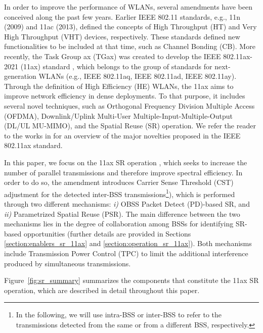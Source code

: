 \documentclass{ieeeaccess}
\begin{document}
In order to improve the performance of WLANs, several amendments have been conceived along the past few years. Earlier IEEE 802.11 standards, e.g., 11n (2009) and 11ac (2013), defined the concepts of High Throughput (HT) and Very High Throughput (VHT) devices, respectively. These standards defined new functionalities to be included at that time, such as Channel Bonding (CB). More recently, the Task Group ax (TGax) was created to develop the IEEE 802.11ax-2021 (11ax) standard \cite{tgax2019draft}, which belongs to the group of standards for next-generation WLANs (e.g., IEEE 802.11aq, IEEE 802.11ad, IEEE 802.11ay). Through the definition of High Efficiency (HE) WLANs, the 11ax aims to improve network efficiency in dense deployments. To that purpose, it includes several novel techniques, such as Orthogonal Frequency Division Multiple Access (OFDMA), Downlink/Uplink Multi-User Multiple-Input-Multiple-Output (DL/UL MU-MIMO), and the Spatial Reuse (SR) operation. We refer the reader to the works in \cite{bellalta2016ieee, afaqui2016ieee, qu2018survey, khorov2018tutorial} for an overview of the major novelties proposed in the IEEE 802.11ax standard.

In this paper, we focus on the 11ax SR operation \cite{merlin2009methods}, which seeks to increase the number of parallel transmissions and therefore improve spectral efficiency. In order to do so, the amendment introduces Carrier Sense Threshold (CST) adjustment for the detected inter-BSS transmissions\footnote{In the following, we will use intra-BSS or inter-BSS to refer to the transmissions detected from the same or from a different BSS, respectively.}), which is performed through two different mechanisms: \emph{i)} OBSS Packet Detect (PD)-based SR, and \emph{ii)} Parametrized Spatial Reuse (PSR). The main difference between the two mechanisms lies in the degree of collaboration among BSSs for identifying SR-based opportunities (further details are provided in Sections \ref{section:enablers_sr_11ax} and \ref{section:operation_sr_11ax}). Both mechanisms include Transmission Power Control (TPC) to limit the additional interference produced by simultaneous transmissions. 

Figure~\ref{fig:sr_summary} summarizes the components that constitute the 11ax SR operation, which are described in detail throughout this paper.
\end{document}
